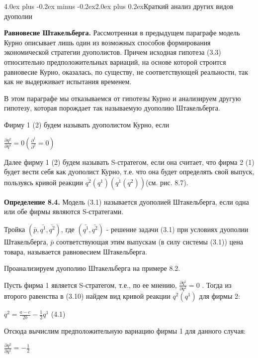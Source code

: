 \documentclass[12pt, 4paper]{book}
\makeatletter
\renewcommand{\section}{\@startsection{section}{1}{1pt}%
	{4.0ex plus -0.2ex minus -0.2ex}{2.0ex plus 0.2ex}{\centering\bf}}%
\makeatother
\begin{document}
{\begin{center}
\section{Краткий анализ других видов дуополии}
\end{center}
\par

\textbf{Равновесие Штакельберга.} Рассмотренная в предыдущем параграфе модель Курно описывает лишь один из возможных способов формирования экономической стратегии дуополистов. Причем исходная гипотеза (3.3) относительно предположительных вариаций, на основе которой строится равновесие Курно, оказалась, по существу, не соответствующей реальности, так как не выдерживает испытания временем.
\par

В этом параграфе мы отказываемся от гипотезы Курно и анализируем другую гипотезу, которая порождает так называемую дуополию Штакельберга.
\par

Фирму 1 (2) будем называть дуополистом Курно, если 
\begin{center}
$\frac{\partial q^2}{\partial q^1}=0 (\frac{\partial ^1}{\partial ^2}=0)$
\end{center}
\par

Далее фирму 1 (2) будем называть S-стратегом, если она считает, что фирма 2 (1) будет вести себя как дуополист Курно, т.е. что она будет определять свой выпуск, пользуясь кривой реакции $\bar{q^2}(q^1)(\bar{q^1}(q^2)) $(см. рис. 8.7).
\par

\textbf{Определение 8.4. }Модель (3.1) называется дуополией Штакельберга, если одна или обе фирмы являются S-стратегами.
\par

Тройка $(\bar{p},\bar{q^1},\bar{q^2})$, где $(\bar{q^1},\bar{q^2})$ - решение задачи (3.1) при условиях дуополии Штакельберга,  $\bar{p}$ соответствующая этим выпускам (в силу системы (3.1)) цена товара, называется равновесием Штакельберга.
\par

Проанализируем дуополию Штакельберга на примере 8.2.
\par

Пусть фирма 1 является S-стратегом, т.е., по ее мнению, $\frac{\partial q^1}{\partial q^2} = 0$ . Тогда из второго равенства в (3.10) найдем вид кривой реакции $q^2(q^1)$ для фирмы 2:
\begin{center}
$q^2=\frac{a-c}{2b}-\frac{1}{2}q^1$ (4.1)
\end{center}
Отсюда вычислим предположительную вариацию фирмы 1 для данного случая:
\begin{center}
$\frac{\partial q^2}{\partial q^1}=-\frac{1}{2}$
\end{center}
\par

}
\end{document}
